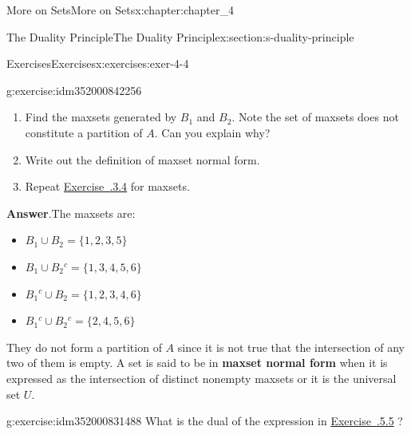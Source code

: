\documentclass[oneside,10pt,]{book}
\newcommand{\blocktitlefont}{\relax}
\newcommand{\xreffont}{\relax}
\newcommand{\terminology}[1]{\textbf{#1}}
\begin{document}
\begin{chapterptx}{More on Sets}{}{More on Sets}{}{}{x:chapter:chapter_4}
\begin{sectionptx}{The Duality Principle}{}{The Duality Principle}{}{}{x:section:s-duality-principle}
\begin{exercises-subsection}{Exercises}{}{Exercises}{}{}{x:exercises:exer-4-4}
\begin{divisionexercise}{5}{}{}{g:exercise:idm352000842256}
\par
%
\begin{enumerate}[label=(\alph*)]
\item{}Find the maxsets generated by \(B_1\) and \(B_2\). Note the set of maxsets does not constitute a partition of \(A\). Can you explain why?%
\item{}Write out the definition of maxset normal form.%
\item{}Repeat \hyperlink{x:exercise:exercise-minsets-3}{Exercise~{\xreffont 1.3.3.4}}  for maxsets.%
\end{enumerate}
%
\par\smallskip%
\noindent\textbf{\blocktitlefont Answer}.\hypertarget{g:answer:idm352000836896}{}\quad{}The maxsets are:%
\par
%
\begin{itemize}[label=\textbullet]
\item{}\(\displaystyle B_1\cup B_2=\{1,2,3,5\}\)%
\item{}\(\displaystyle B_1\cup B_2{}^c=\{1,3,4,5,6\}\)%
\item{}\(\displaystyle B_1{}^c\cup B_2=\{1,2,3,4,6\}\)%
\item{}\(\displaystyle B_1{}^c\cup B_2{}^c=\{2,4,5,6\}\)%
\end{itemize}
%
\par
They do not form a partition of \(A\) since it is not true that the intersection of any two of them is empty. A set is said to be in \terminology{maxset normal form} when it is expressed as the intersection of distinct nonempty maxsets or it is the universal set \(U\).%
\end{divisionexercise}%
\begin{divisionexercise}{6}{}{}{g:exercise:idm352000831488}%
What is the dual of the expression in \hyperlink{x:exercise:ex-generalized_distrib}{Exercise~{\xreffont 1.1.5.5}} ?%
\end{divisionexercise}%
\end{exercises-subsection}
\end{sectionptx}
\end{chapterptx}
%
%
%
%
\typeout{************************************************}
\typeout{************************************************}
%
%
\appendix
%
\end{document}
